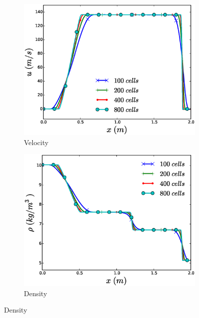 \documentclass{inputs/mc2015}
\begin{document}
\begin{figure}[H]
        \centering
        \begin{subfigure}[b]{0.5\textwidth}
                \centering
                \includegraphics[width=\textwidth]{figures/vapor-mesh-sensitivity-velocity-plot.eps}
                \caption{Velocity}
                \label{fig:vapor-tube-plots-vel}
        \end{subfigure}%
        \begin{subfigure}[b]{0.5\textwidth}
                \centering
                \includegraphics[width=\textwidth]{figures/vapor-mesh-sensitivity-density-plot.eps}
                \caption{Density}
                \label{fig:vapor-tube-plots-dens}
        \end{subfigure}
        

\end{figure}
\end{document}
